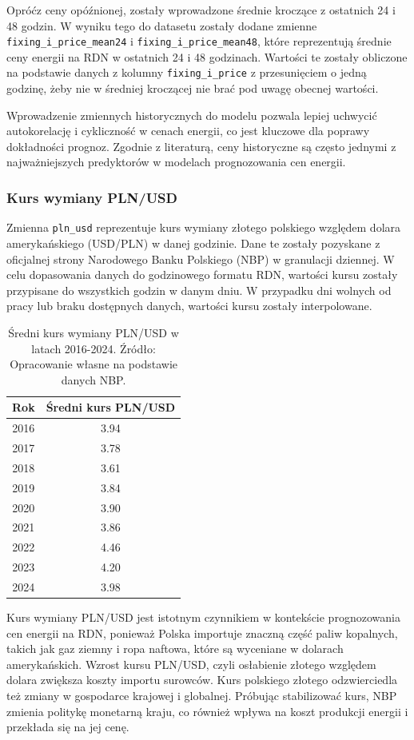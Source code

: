 Opróćz ceny opóźnionej, zostały wprowadzone średnie kroczące z ostatnich 24 i 48 godzin. W wyniku tego do datasetu zostały dodane zmienne \texttt{fixing\_i\_price\_mean24} i \texttt{fixing\_i\_price\_mean48}, które reprezentują średnie ceny energii na RDN w ostatnich 24 i 48 godzinach. Wartości te zostały obliczone na podstawie danych z kolumny \texttt{fixing\_i\_price} z przesunięciem o jedną godzinę, żeby nie w średniej kroczącej nie brać pod uwagę obecnej wartości.

Wprowadzenie zmiennych historycznych do modelu pozwala lepiej uchwycić autokorelację i cykliczność w cenach energii, co jest kluczowe dla poprawy dokładności prognoz. Zgodnie z literaturą, ceny historyczne są często jednymi z najważniejszych predyktorów w modelach prognozowania cen energii.

\subsubsection{Kurs wymiany PLN/USD}
\label{subsec:pln_usd}

Zmienna \texttt{pln\_usd} reprezentuje kurs wymiany złotego polskiego względem dolara amerykańskiego (USD/PLN) w danej godzinie. Dane te zostały pozyskane z oficjalnej strony Narodowego Banku Polskiego (NBP) w granulacji dziennej. W celu dopasowania danych do godzinowego formatu RDN, wartości kursu zostały przypisane do wszystkich godzin w danym dniu. W przypadku dni wolnych od pracy lub braku dostępnych danych, wartości kursu zostały interpolowane.

\begin{table}[H]
    \centering
    \begin{tabular}{|c|c|}
    \hline
    \textbf{Rok} & \textbf{Średni kurs PLN/USD} \\ \hline
    2016 & 3.94 \\ \hline
    2017 & 3.78 \\ \hline
    2018 & 3.61 \\ \hline
    2019 & 3.84 \\ \hline
    2020 & 3.90 \\ \hline
    2021 & 3.86 \\ \hline
    2022 & 4.46 \\ \hline
    2023 & 4.20 \\ \hline
    2024 & 3.98 \\ \hline
    \end{tabular}
    \caption{Średni kurs wymiany PLN/USD w latach 2016-2024. Źródło: Opracowanie własne na podstawie danych NBP.}
    \label{tab:pln-usd-exchange-rate}
\end{table}

Kurs wymiany PLN/USD jest istotnym czynnikiem w kontekście prognozowania cen energii na RDN, ponieważ Polska importuje znaczną część paliw kopalnych, takich jak gaz ziemny i ropa naftowa, które są wyceniane w dolarach amerykańskich. Wzrost kursu PLN/USD, czyli osłabienie złotego względem dolara zwiększa koszty importu surowców. Kurs polskiego złotego odzwierciedla też zmiany w gospodarce krajowej i globalnej. Próbując stabilizować kurs, NBP zmienia politykę monetarną kraju, co również wpływa na koszt produkcji energii i przekłada się na jej cenę.